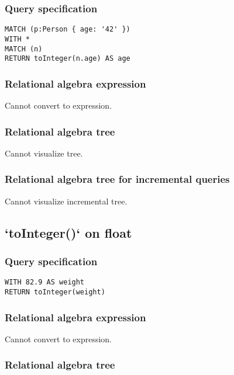 \subsubsection*{Query specification}

\begin{lstlisting}
MATCH (p:Person { age: '42' })
WITH *
MATCH (n)
RETURN toInteger(n.age) AS age
\end{lstlisting}

\subsubsection*{Relational algebra expression}

Cannot convert to expression.

\subsubsection*{Relational algebra tree}

Cannot visualize tree.

\subsubsection*{Relational algebra tree for incremental queries}

Cannot visualize incremental tree.

\subsection{`toInteger()` on float}

\subsubsection*{Query specification}

\begin{lstlisting}
WITH 82.9 AS weight
RETURN toInteger(weight)
\end{lstlisting}

\subsubsection*{Relational algebra expression}

Cannot convert to expression.

\subsubsection*{Relational algebra tree}

